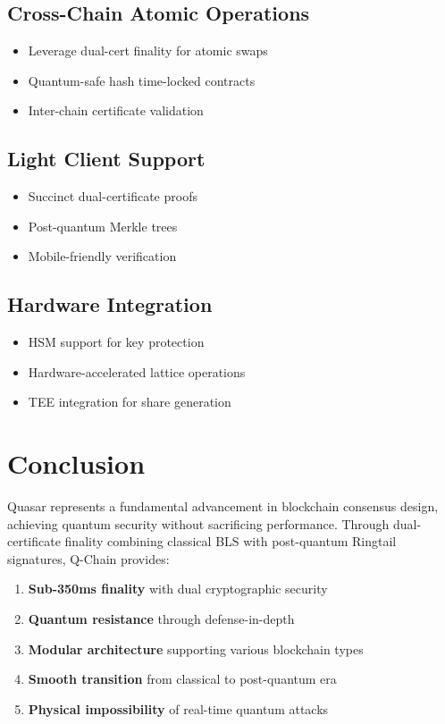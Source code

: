 \documentclass[11pt]{article}
\begin{document}
\subsection{Cross-Chain Atomic Operations}
\begin{itemize}
\item Leverage dual-cert finality for atomic swaps
\item Quantum-safe hash time-locked contracts
\item Inter-chain certificate validation
\end{itemize}

\subsection{Light Client Support}
\begin{itemize}
\item Succinct dual-certificate proofs
\item Post-quantum Merkle trees
\item Mobile-friendly verification
\end{itemize}

\subsection{Hardware Integration}
\begin{itemize}
\item HSM support for key protection
\item Hardware-accelerated lattice operations
\item TEE integration for share generation
\end{itemize}

\section{Conclusion}

Quasar represents a fundamental advancement in blockchain consensus design, achieving quantum security without sacrificing performance. Through dual-certificate finality combining classical BLS with post-quantum Ringtail signatures, Q-Chain provides:

\begin{enumerate}
\item \textbf{Sub-350ms finality} with dual cryptographic security
\item \textbf{Quantum resistance} through defense-in-depth
\item \textbf{Modular architecture} supporting various blockchain types
\item \textbf{Smooth transition} from classical to post-quantum era
\item \textbf{Physical impossibility} of real-time quantum attacks
\end{enumerate}
\end{document}
